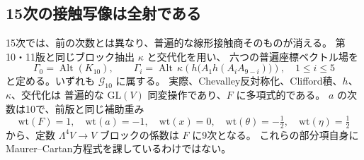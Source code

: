\documentclass[a4paper,11pt]{ltjsarticle}
\theoremstyle{definition}
\begin{document}
\subsection{15次の接触写像は全射である}
\label{subsec:v12-contact-rank-fifteenth}

15次では、前の次数とは異なり、普遍的な線形接触商そのものが消える。
第10・11版と同じブロック抽出 $\kappa$ と交代化を用い、
六つの普遍座標ベクトル場を
\[
 \Gamma_0=\operatorname{Alt}(K_{10}),\qquad
 \Gamma_i=\operatorname{Alt}\,\kappa\!\left(
      h\bigl(A_1h(A_iA_{9-i})\bigr)\right),\quad1\le i\le5
\]
と定める。いずれも $\mathcal G_{10}$ に属する。
実際、Chevalley反対称化、Clifford積、$h$、$\kappa$、交代化は
普遍的な $\mathrm{GL}(V)$ 同変操作であり、$F$ に多項式的である。
$a$ の次数は10で、前版と同じ補助重み
\[
 \mathrm{wt}(F)=1,\quad\mathrm{wt}(a)=-1,\quad
 \mathrm{wt}(x)=0,\quad\mathrm{wt}(\theta)=-\tfrac12,
 \quad\mathrm{wt}(\eta)=\tfrac12
\]
から、定数 $\Lambda^4V\to V$ ブロックの係数は $F$ に9次となる。
これらの部分項自身にMaurer--Cartan方程式を課しているわけではない。
\end{document}
